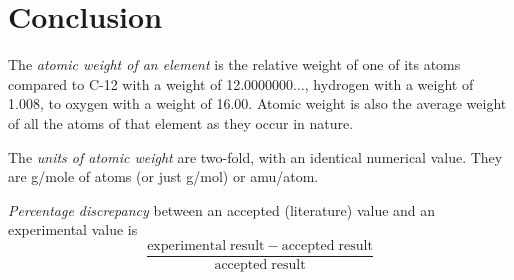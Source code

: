 \documentclass{article}
\begin{document}
\section{Conclusion}

\begin{enumerate}
\begin{item}
The \emph{atomic weight of an element} is the relative weight of one of its atoms compared to C-12 with a weight of 12.0000000$\ldots$, hydrogen with a weight of 1.008, to oxygen with a weight of 16.00. Atomic weight is also the average weight of all the atoms of that element as they occur in nature.
\end{item}
\begin{item}
The \emph{units of atomic weight} are two-fold, with an identical numerical value. They are g/mole of atoms (or just g/mol) or amu/atom.
\end{item}
\begin{item}
\emph{Percentage discrepancy} between an accepted (literature) value and an experimental value is
\begin{equation*}
\frac{\mathrm{experimental\;result} - \mathrm{accepted\;result}}{\mathrm{accepted\;result}}
\end{equation*}
\end{item}
\end{enumerate}






\end{document}
